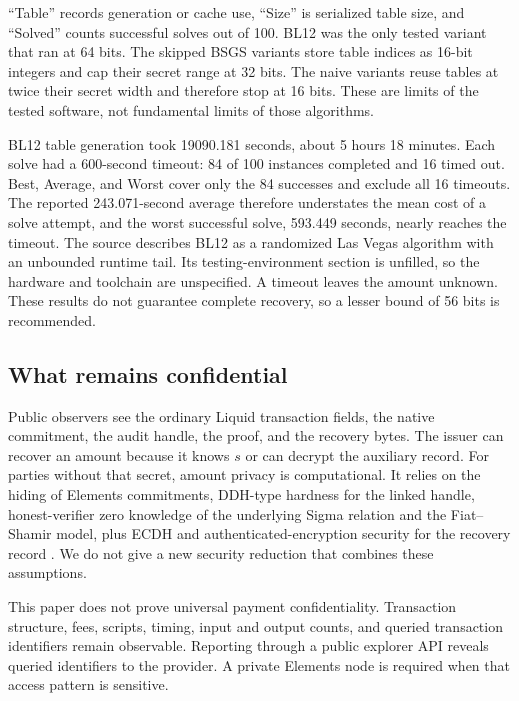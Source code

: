 \documentclass[11pt]{article}
\begin{document}
    ``Table'' records generation or cache use, ``Size'' is serialized table size, and ``Solved'' counts successful solves out of 100.
    BL12 was the only tested variant that ran at 64 bits.
    The skipped BSGS variants store table indices as 16-bit integers and cap their secret range at 32 bits. The naive variants reuse tables at twice their secret width and therefore stop at 16 bits.
    These are limits of the tested software, not fundamental limits of those algorithms.

    BL12 table generation took 19090.181 seconds, about 5 hours 18 minutes.
    Each solve had a 600-second timeout: 84 of 100 instances completed and 16 timed out.
    Best, Average, and Worst cover only the 84 successes and exclude all 16 timeouts.
    The reported 243.071-second average therefore understates the mean cost of a solve attempt, and the worst successful solve, 593.449 seconds, nearly reaches the timeout.
    The source describes BL12 as a randomized Las Vegas algorithm with an unbounded runtime tail.
    Its testing-environment section is unfilled, so the hardware and toolchain are unspecified.
    A timeout leaves the amount unknown.
    These results do not guarantee complete recovery, so a lesser bound of 56 bits is recommended.

    \subsection{What remains confidential}

    Public observers see the ordinary Liquid transaction fields, the native commitment, the audit handle, the proof, and the recovery bytes.
    The issuer can recover an amount because it knows $s$ or can decrypt the auxiliary record.
    For parties without that secret, amount privacy is computational.
    It relies on the hiding of Elements commitments, DDH-type hardness for the linked handle, honest-verifier zero knowledge of the underlying Sigma relation and the Fiat--Shamir model, plus ECDH and authenticated-encryption security for the recovery record \cite{pgc,faust-fiat-shamir}.
    We do not give a new security reduction that combines these assumptions.

    This paper does not prove universal payment confidentiality.
    Transaction structure, fees, scripts, timing, input and output counts, and queried transaction identifiers remain observable.
    Reporting through a public explorer API reveals queried identifiers to the provider.
    A private Elements node is required when that access pattern is sensitive.
\end{document}
